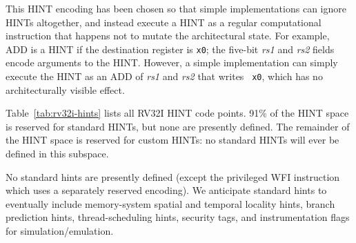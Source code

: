 \begin{commentary}
This HINT encoding has been chosen so that simple implementations can ignore
HINTs altogether, and instead execute a HINT as a regular computational
instruction that happens not to mutate the architectural state.  For example, ADD is
a HINT if the destination register is {\tt x0}; the five-bit {\em rs1} and {\em
rs2} fields encode arguments to the HINT.  However, a simple implementation can
simply execute the HINT as an ADD of {\em rs1} and {\em rs2} that writes {\tt
x0}, which has no architecturally visible effect.
\end{commentary}

Table~\ref{tab:rv32i-hints} lists all RV32I HINT code points.  91\% of the HINT
space is reserved for standard HINTs, but none are presently defined.  The
remainder of the HINT space is reserved for custom HINTs: no standard HINTs
will ever be defined in this subspace.

\begin{commentary}
No standard hints are presently defined (except the privileged WFI
instruction which uses a separately reserved encoding).  We anticipate
standard hints to eventually include memory-system spatial and
temporal locality hints, branch prediction hints, thread-scheduling
hints, security tags, and instrumentation flags for
simulation/emulation.
\end{commentary}

